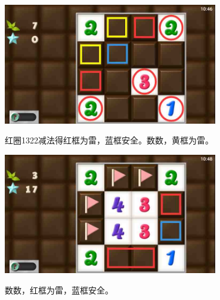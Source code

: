 \subsection{} %
\begin{center}
    \includegraphics[width=0.7\textwidth]{puzzlelow/186-1.jpg}
\end{center}
红圈1322减法得红框为雷，蓝框安全。数数，黄框为雷。
\begin{center}
    \includegraphics[width=0.7\textwidth]{puzzlelow/186-2.jpg}
\end{center}
数数，红框为雷，蓝框安全。

